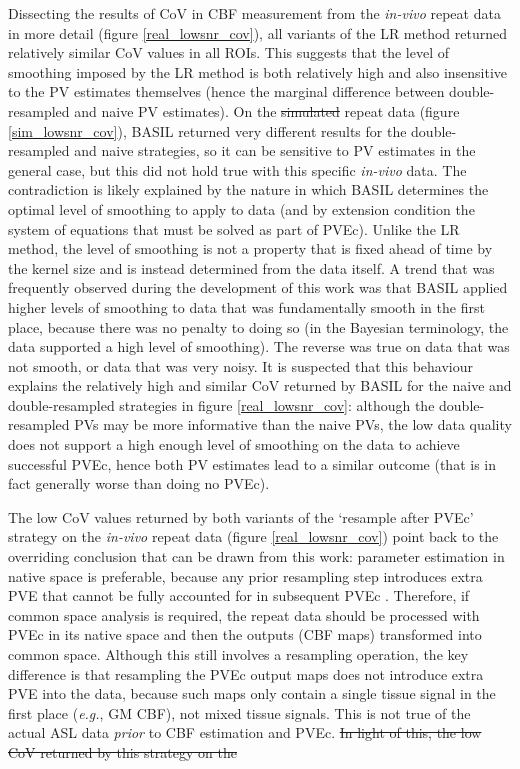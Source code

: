 \documentclass[12pt]{report}
\providecommand{\DIFaddtex}[1]{{\protect\color{blue}\uwave{#1}}} %
\providecommand{\DIFdeltex}[1]{{\protect\color{red}\sout{#1}}}                      %
\providecommand{\DIFaddbegin}{} %
\providecommand{\DIFaddend}{} %
\providecommand{\DIFdelbegin}{} %
\providecommand{\DIFdelend}{} %
\providecommand{\DIFadd}[1]{\texorpdfstring{\DIFaddtex{#1}}{#1}} %
\providecommand{\DIFdel}[1]{\texorpdfstring{\DIFdeltex{#1}}{}} %
\newcommand{\DIFscaledelfig}{0.5}
\newlength{\DIFdelgraphicswidth} %
\newlength{\DIFdelgraphicsheight} %
\newcommand{\DIFaddincludegraphics}[2][]{{\color{blue}\fbox{\DIFOincludegraphics[#1]{#2}}}} %
\newcommand{\DIFdelincludegraphics}[2][]{%
\sbox{\DIFdelgraphicsbox}{\DIFOincludegraphics[#1]{#2}}%
\settoboxwidth{\DIFdelgraphicswidth}{\DIFdelgraphicsbox} %
\settoboxtotalheight{\DIFdelgraphicsheight}{\DIFdelgraphicsbox} %
\scalebox{\DIFscaledelfig}{%
\parbox[b]{\DIFdelgraphicswidth}{\usebox{\DIFdelgraphicsbox}\\[-\baselineskip] \rule{\DIFdelgraphicswidth}{0em}}\llap{\resizebox{\DIFdelgraphicswidth}{\DIFdelgraphicsheight}{%
\setlength{\unitlength}{\DIFdelgraphicswidth}%
\begin{picture}(1,1)%
\thicklines\linethickness{2pt} %
{\color[rgb]{1,0,0}\put(0,0){\framebox(1,1){}}}%
{\color[rgb]{1,0,0}\put(0,0){\line( 1,1){1}}}%
{\color[rgb]{1,0,0}\put(0,1){\line(1,-1){1}}}%
\end{picture}%
}\hspace*{3pt}}} %
} %
\DeclareRobustCommand{\DIFaddbegin}{\DIFOaddbegin \let\includegraphics\DIFaddincludegraphics} %
\DeclareRobustCommand{\DIFaddend}{\DIFOaddend \let\includegraphics\DIFOincludegraphics} %
\DeclareRobustCommand{\DIFdelbegin}{\DIFOdelbegin \let\includegraphics\DIFdelincludegraphics} %
\DeclareRobustCommand{\DIFdelend}{\DIFOaddend \let\includegraphics\DIFOincludegraphics} %
\begin{document}
Dissecting the results of CoV in CBF measurement from the \textit{in-vivo} repeat data in more detail (figure \ref{real_lowsnr_cov}), all variants of the LR method returned relatively similar CoV values in all ROIs. This suggests that the level of smoothing imposed by the LR method is both relatively high and also insensitive to the PV estimates themselves (hence the marginal difference between double-resampled and naive PV estimates). On the \DIFdelbegin \DIFdel{simulated }\DIFdelend \DIFaddbegin \textit{\DIFadd{simulated}} \DIFaddend repeat data (figure \ref{sim_lowsnr_cov}), BASIL returned very different results for the double-resampled and naive strategies, so it can be sensitive to PV estimates in the general case, but this did not hold true with this specific \textit{in-vivo} data. The contradiction is likely explained by the nature in which BASIL determines the optimal level of smoothing to apply to data (and by extension condition the system of equations that must be solved as part of PVEc). Unlike the LR method, the level of smoothing is not a property that is fixed ahead of time by the kernel size and is instead determined from the data itself. A trend that was frequently observed during the development of this work was that BASIL applied higher levels of smoothing to data that was fundamentally smooth in the first place, because there was no penalty to doing so (in the Bayesian terminology, the data supported a high level of smoothing). The reverse was true on data that was not smooth, or data that was very noisy. It is suspected that this behaviour explains the relatively high and similar CoV returned by BASIL for the naive and double-resampled strategies in figure \ref{real_lowsnr_cov}: although the double-resampled PVs may be more informative than the naive PVs, the low data quality does not support a high enough level of smoothing on the data to achieve successful PVEc, hence both PV estimates lead to a similar outcome (that is in fact generally worse than doing no PVEc). 

The low CoV values returned by both variants of the `resample after PVEc' strategy on the \textit{in-vivo} repeat data (figure \ref{real_lowsnr_cov}) point back to the overriding conclusion that can be drawn from this work: parameter estimation in native space is preferable, because any prior resampling step introduces extra PVE that cannot be fully accounted for in subsequent PVEc \DIFaddbegin \DIFadd{(even with the double resampling strategy)}\DIFaddend . Therefore, if common space analysis is required, the repeat data should be processed with PVEc in its native space and then the outputs (CBF maps) transformed into common space. Although this still involves a resampling operation, the key difference is that resampling the PVEc output maps does not introduce extra PVE into the data, because such maps only contain a single tissue signal in the first place (\textit{e.g.}, GM CBF), not mixed tissue signals. This is not true of the actual ASL data \textit{prior} to CBF estimation and PVEc. 
\DIFdelbegin \DIFdel{In light of this, the low CoV returned by this strategy on the }\DIFdelend \DIFaddbegin 
\end{document}
